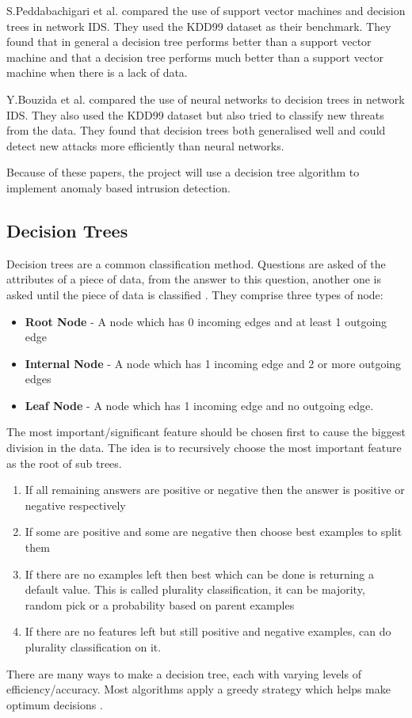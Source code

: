 S.Peddabachigari et al. \cite{Peddabachigari} compared the use of support vector machines and decision trees in network IDS. They used the KDD99 dataset as their benchmark. They found that in general a decision tree performs better than a support vector machine and that a decision tree performs much better than a support vector machine when there is a lack of data. 

Y.Bouzida et al. \cite{bouzida} compared the use of neural networks to decision trees in network IDS. They also used the KDD99 dataset but also tried to classify new threats from the data. They found that decision trees both generalised well and could detect new attacks more efficiently than neural networks.

Because of these papers, the project will use a decision tree algorithm to implement anomaly based intrusion detection.

\subsection{Decision Trees}
Decision trees are a common classification method. Questions are asked of the attributes of a piece of data, from the answer to this question, another one is asked until the piece of data is classified \cite{I2DM}. They comprise three types of node:

\begin{itemize}
 \item \textbf{Root Node} - A node which has 0 incoming edges and at least 1 outgoing edge
 \item \textbf{Internal Node} - A node which has 1 incoming edge and 2 or more outgoing edges
 \item \textbf{Leaf Node} - A node which has 1 incoming edge and no outgoing edge.
\end{itemize}

The most important/significant feature should be chosen first to cause the biggest division in the data. The idea is to recursively choose the most important feature as the root of sub trees.
\begin{enumerate}
 \item If all remaining answers are positive or negative then the answer is positive or negative respectively
 \item If some are positive and some are negative then choose best examples to split them
 \item If there are no examples left then best which can be done is returning a default value. This is called plurality classification, it can be majority, random pick or a probability based on parent examples
 \item If there are no features left but still positive and negative examples, can do plurality classification on it.
\end{enumerate}
There are many ways to make a decision tree, each with varying levels of efficiency/accuracy. Most algorithms apply a greedy strategy which helps make optimum decisions \cite{10.5555/2380985}.
